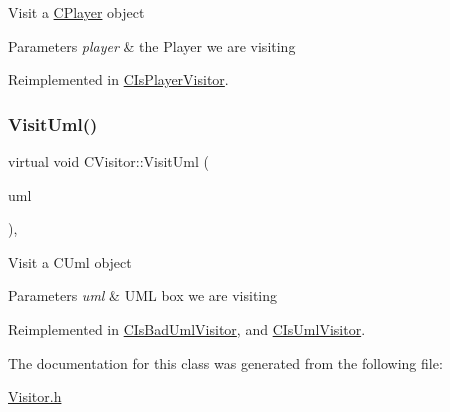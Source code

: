 Visit a \mbox{\hyperlink{class_c_player}{C\+Player}} object 
\begin{DoxyParams}{Parameters}
{\em player} & the Player we are visiting \\
\hline
\end{DoxyParams}


Reimplemented in \mbox{\hyperlink{class_c_is_player_visitor_ade10af41a195ead29f30ed6fffb4c3bd}{C\+Is\+Player\+Visitor}}.

\mbox{\label{class_c_visitor_abf6343050ae9c2f2526fa6a17ec891a2}} 
\subsubsection{\texorpdfstring{VisitUml()}{VisitUml()}}
{\footnotesize\ttfamily virtual void C\+Visitor\+::\+Visit\+Uml (\begin{DoxyParamCaption}\item[{\mbox{\hyperlink{class_c_uml_box}{C\+Uml\+Box}} $\ast$}]{uml }\end{DoxyParamCaption})\hspace{0.3cm}{\ttfamily [inline]}, {\ttfamily [virtual]}}

Visit a C\+Uml object 
\begin{DoxyParams}{Parameters}
{\em uml} & U\+ML box we are visiting \\
\hline
\end{DoxyParams}


Reimplemented in \mbox{\hyperlink{class_c_is_bad_uml_visitor_a749753fc1c57d534faf60a016a4fd745}{C\+Is\+Bad\+Uml\+Visitor}}, and \mbox{\hyperlink{class_c_is_uml_visitor_ac49fb3a73f9949c21faf54d92d366b7c}{C\+Is\+Uml\+Visitor}}.



The documentation for this class was generated from the following file\+:\begin{DoxyCompactItemize}
\item 
\mbox{\hyperlink{_visitor_8h}{Visitor.\+h}}\end{DoxyCompactItemize}
